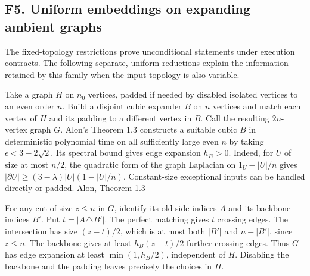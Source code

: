 \documentclass[
  11pt,
]{article}
\begin{document}
\subsection{F5. Uniform embeddings on expanding ambient
graphs}\label{v8-f5.-uniform-embeddings-on-expanding-ambient-graphs}

The fixed-topology restrictions prove unconditional statements under
execution contracts. The following separate, uniform reductions explain
the information retained by this family when the input topology is also
variable.

Take a graph \(H\) on \(n_0\) vertices, padded if needed by disabled
isolated vertices to an even order \(n\). Build a disjoint cubic
expander \(B\) on \(n\) vertices and match each vertex of \(H\) and its
padding to a different vertex in \(B\). Call the resulting \(2n\)-vertex
graph \(G\). Alon's Theorem 1.3 constructs a suitable cubic \(B\) in
deterministic polynomial time on all sufficiently large even \(n\) by
taking \(\epsilon<3-2\sqrt2\). Its spectral bound gives edge expansion
\(h_B>0\). Indeed, for \(U\) of size at most \(n/2\), the quadratic form
of the graph Laplacian on \(1_U-|U|/n\) gives
\(|\partial U|\ge(3-\lambda)|U|(1-|U|/n)\). Constant-size exceptional
inputs can be handled directly or padded.
\href{https://web.math.princeton.edu/~nalon/PDFS/expexpg.pdf}{Alon,
Theorem 1.3}

For any cut of size \(z\le n\) in \(G\), identify its old-side indices
\(A\) and its backbone indices \(B'\). Put \(t=|A\triangle B'|\). The
perfect matching gives \(t\) crossing edges. The intersection has size
\((z-t)/2\), which is at most both \(|B'|\) and \(n-|B'|\), since
\(z\le n\). The backbone gives at least \(h_B(z-t)/2\) further crossing
edges. Thus \(G\) has edge expansion at least \(\min(1,h_B/2)\),
independent of \(H\). Disabling the backbone and the padding leaves
precisely the choices in \(H\).
\end{document}
